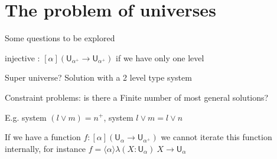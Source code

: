 \documentclass[11pt,a4paper]{article}
\newcommand{\lam}[2]{{\langle}#1{\rangle}#2}
\def\UU{\mathsf{U}}
\begin{document}
\section*{The problem of universes}

Some questions to be explored

\medskip

injective : $[\alpha](\UU_{\alpha^+}\rightarrow \UU_{\alpha^+})$ if we have only one level

Super universe? Solution with a 2 level type system

Constraint problems: is there a Finite number of most general solutions?

E.g. system $(l\vee m) = n^+$, system $l\vee m  = l\vee n$

If we have a function $f:[\alpha](\UU_{\alpha}\rightarrow \UU_{\alpha^+})$ we cannot iterate
this function internally, for instance  $f = \lam{\alpha}{\lambda (X:\UU_{\alpha})~X\rightarrow\UU_{\alpha}}$





%





\end{document}
